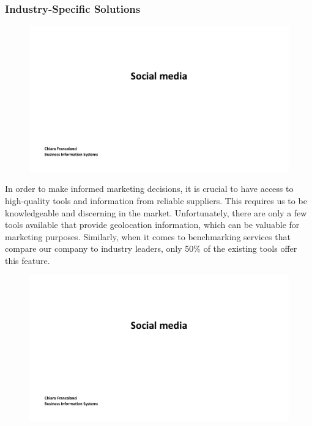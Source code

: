 \subsubsection{Industry-Specific
    Solutions}\label{industry-specific-solutions}

\begin{figure}[!h]
    \centering
    \includegraphics[page=33, trim = 1cm 8cm 1cm 3.5cm, clip, width=\textwidth]{images/04 - Social_Media.pdf}
\end{figure}

In order to make informed marketing decisions, it is crucial to have
access to high-quality tools and information from reliable suppliers.
This requires us to be knowledgeable and discerning in the market.
Unfortunately, there are only a few tools available that provide
geolocation information, which can be valuable for marketing purposes.
Similarly, when it comes to benchmarking services that compare our
company to industry leaders, only 50\% of the existing tools offer this
feature.

\begin{figure}[!h]
    \centering
    \includegraphics[page=34, trim = 1cm 4.5cm 1cm 0.5cm, clip, width=\textwidth]{images/04 - Social_Media.pdf}
\end{figure}

